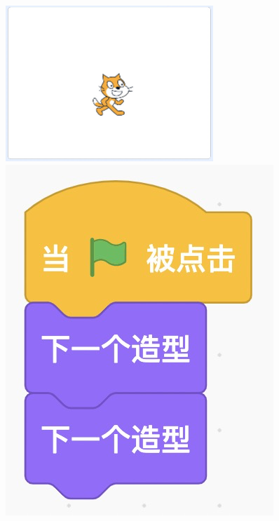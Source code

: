 \documentclass[10pt, a4paper]{article}
\begin{document}
\begin{enumerate}
\begin{figure}[htbp]
\begin{minipage}[t]{.48\textwidth}
\begin{minipage}{.3\textwidth}
                \end{minipage}
                \begin{minipage}{.4\textwidth}
                    \centering
                    \includegraphics[width=\textwidth]{10-2.png}
                \end{minipage}
                \begin{minipage}{.25\textwidth}
                    \centering
                    \includegraphics[width=\textwidth]{10-3.png}

\end{minipage}
\end{minipage}
\end{figure}
\end{enumerate}
\end{document}
